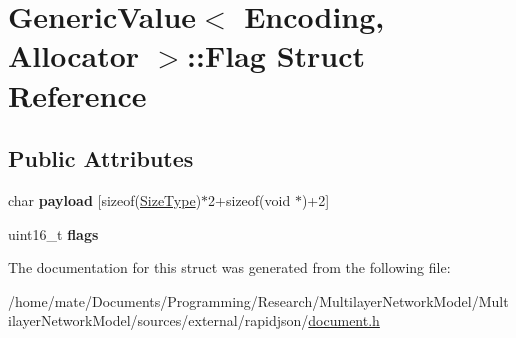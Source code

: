 \hypertarget{structGenericValue_1_1Flag}{}\section{Generic\+Value$<$ Encoding, Allocator $>$\+:\+:Flag Struct Reference}
\label{structGenericValue_1_1Flag}
\subsection*{Public Attributes}
\begin{DoxyCompactItemize}
\item 
char {\bfseries payload} \mbox{[}sizeof(\hyperlink{rapidjson_8h_a5ed6e6e67250fadbd041127e6386dcb5}{Size\+Type})$\ast$2+sizeof(void $\ast$)+2\mbox{]}\hypertarget{structGenericValue_1_1Flag_ac5512252dcb1f2e4b0231dbde504c656}{}\label{structGenericValue_1_1Flag_ac5512252dcb1f2e4b0231dbde504c656}

\item 
uint16\+\_\+t {\bfseries flags}\hypertarget{structGenericValue_1_1Flag_ac91f08067dcc0003fc78e870ca9b2d5d}{}\label{structGenericValue_1_1Flag_ac91f08067dcc0003fc78e870ca9b2d5d}

\end{DoxyCompactItemize}


The documentation for this struct was generated from the following file\+:\begin{DoxyCompactItemize}
\item 
/home/mate/\+Documents/\+Programming/\+Research/\+Multilayer\+Network\+Model/\+Multilayer\+Network\+Model/sources/external/rapidjson/\hyperlink{document_8h}{document.\+h}\end{DoxyCompactItemize}
